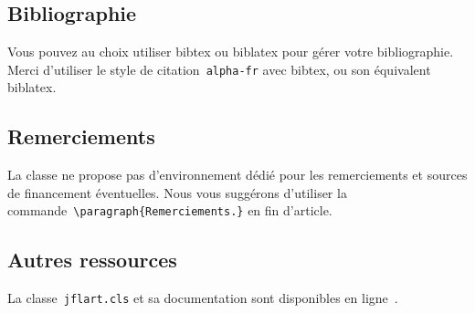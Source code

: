 \documentclass{jflart}
\newcommand{\cmd}[1]{\texttt{\textbackslash {#1}}}
\begin{document}

\subsection{Bibliographie}

Vous pouvez au choix utiliser bibtex ou biblatex pour gérer votre bibliographie.
%
Merci d'utiliser le style de citation~\texttt{alpha-fr} avec bibtex, ou son
équivalent biblatex.

\subsection{Remerciements}

La classe ne propose pas d'environnement dédié pour les remerciements et sources de financement éventuelles.
%
Nous vous suggérons d'utiliser la commande~\cmd{paragraph\{Remerciements.\}} en
fin d'article.

\subsection{Autres ressources}

La classe~\texttt{jflart.cls} et sa documentation sont disponibles en
ligne~\cite{JFLART}.



\end{document}

